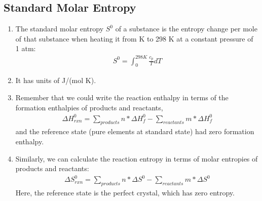 \documentclass{article}  %
\begin{document}
\subsection*{Standard Molar Entropy}
\begin{enumerate}
    \item The standard molar entropy $S^0$ of a substance is the entropy change per mole of that substance when heating it from  K to 298 K at a constant pressure of 1 atm:
        \begin{equation*}
            \begin{aligned}
                S^0 = \int_0^{298K} \frac{c_p}{T}dT
            \end{aligned}
        \end{equation*}
    \item It has units of J/(mol K).
    \item Remember that we could write the reaction enthalpy in terms of the formation enthalpies of products and reactants,
        \begin{equation*}
            \begin{aligned}
                \Delta H_{rxn}^0 = \sum_{products} n*\Delta H_f^0 - \sum_{reactants} m* \Delta H_f^0
            \end{aligned}
        \end{equation*}
        and the reference state (pure elements at standard state) had zero formation enthalpy.
    \item Similarly, we can calculate the reaction entropy in terms of molar entropies of products and reactants:
        \begin{equation*}
            \begin{aligned}
                \Delta S_{rxn}^0 = \sum_{products} n*\Delta S^0 - \sum_{reactants} m* \Delta S^0
            \end{aligned}
        \end{equation*}
        Here, the reference state is the perfect crystal, which has zero entropy.
\end{enumerate}
\end{document}
